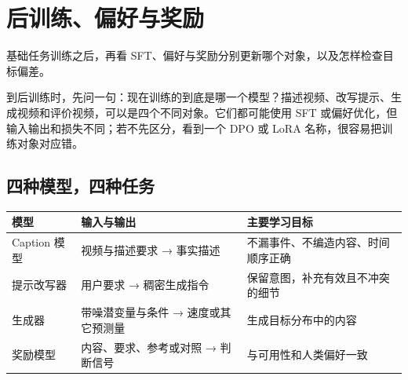 \chapter{后训练、偏好与奖励}\label{seedance-m09}

基础任务训练之后，再看 SFT、偏好与奖励分别更新哪个对象，以及怎样检查目标偏差。

到后训练时，先问一句：现在训练的到底是哪一个模型？描述视频、改写提示、生成视频和评价视频，可以是四个不同对象。它们都可能使用 SFT 或偏好优化，但输入输出和损失不同；若不先区分，看到一个 DPO 或 LoRA 名称，很容易把训练对象对应错。

\section{四种模型，四种任务}\label{seedance-m09-ux56dbux79cdux6a21ux578bux56dbux79cdux4efbux52a1}

{\def\LTcaptype{table} %
\small\setlength{\tabcolsep}{3pt}\renewcommand{\arraystretch}{1.18}
\begin{longtable}[]{@{}
  >{\raggedright\arraybackslash}p{}
  >{\raggedright\arraybackslash}p{}
  >{\raggedright\arraybackslash}p{}@{}}
\toprule\noalign{}
\begin{minipage}[b]{\linewidth}\raggedright
模型
\end{minipage} & \begin{minipage}[b]{\linewidth}\raggedright
输入与输出
\end{minipage} & \begin{minipage}[b]{\linewidth}\raggedright
主要学习目标
\end{minipage} \\
\midrule\noalign{}
\endhead
\bottomrule\noalign{}
\endlastfoot
Caption 模型 & 视频与描述要求 → 事实描述 & 不漏事件、不编造内容、时间顺序正确 \\
提示改写器 & 用户要求 → 稠密生成指令 & 保留意图，补充有效且不冲突的细节 \\
生成器 & 带噪潜变量与条件 → 速度或其它预测量 & 生成目标分布中的内容 \\
奖励模型 & 内容、要求、参考或对照 → 判断信号 & 与可用性和人类偏好一致 \\
\end{longtable}
}

